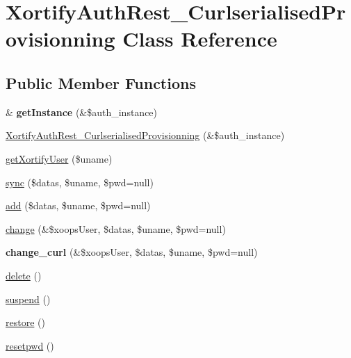\hypertarget{class_xortify_auth_rest___curlserialised_provisionning}{\section{Xortify\-Auth\-Rest\-\_\-\-Curlserialised\-Provisionning Class Reference}
\label{class_xortify_auth_rest___curlserialised_provisionning}
}
\subsection*{Public Member Functions}
\begin{DoxyCompactItemize}
\item 
\hypertarget{class_xortify_auth_rest___curlserialised_provisionning_a2c8eaa915c70d75289ac8a03686194f9}{\& {\bfseries get\-Instance} (\&\$auth\-\_\-instance)}\label{class_xortify_auth_rest___curlserialised_provisionning_a2c8eaa915c70d75289ac8a03686194f9}

\item 
\hyperlink{class_xortify_auth_rest___curlserialised_provisionning_a1910eb4c9f28b81383f5d6db148df984}{Xortify\-Auth\-Rest\-\_\-\-Curlserialised\-Provisionning} (\&\$auth\-\_\-instance)
\item 
\hyperlink{class_xortify_auth_rest___curlserialised_provisionning_a041d726ac26672547ed1504e8e0117aa}{get\-Xortify\-User} (\$uname)
\item 
\hyperlink{class_xortify_auth_rest___curlserialised_provisionning_a35dc08b0f2138eb818ff95345b73bcff}{sync} (\$datas, \$uname, \$pwd=null)
\item 
\hyperlink{class_xortify_auth_rest___curlserialised_provisionning_adfc9fcef01e7bd7b2f47e8e79d51fc63}{add} (\$datas, \$uname, \$pwd=null)
\item 
\hyperlink{class_xortify_auth_rest___curlserialised_provisionning_ae1f0971b9712c794620cf309164e43af}{change} (\&\$xoops\-User, \$datas, \$uname, \$pwd=null)
\item 
\hypertarget{class_xortify_auth_rest___curlserialised_provisionning_aba6f598c234d191a3b3934f90b35fd9f}{{\bfseries change\-\_\-curl} (\&\$xoops\-User, \$datas, \$uname, \$pwd=null)}\label{class_xortify_auth_rest___curlserialised_provisionning_aba6f598c234d191a3b3934f90b35fd9f}

\item 
\hyperlink{class_xortify_auth_rest___curlserialised_provisionning_a13bdffdd926f26b825ea57066334ff01}{delete} ()
\item 
\hyperlink{class_xortify_auth_rest___curlserialised_provisionning_ad73006a505121228f3b075c2409787d2}{suspend} ()
\item 
\hyperlink{class_xortify_auth_rest___curlserialised_provisionning_aa1371f22826cf8cde4454c9b467203d0}{restore} ()
\item 
\hyperlink{class_xortify_auth_rest___curlserialised_provisionning_a06d70fbd3a2db390b6f2530c0076628e}{resetpwd} ()
\end{DoxyCompactItemize}
